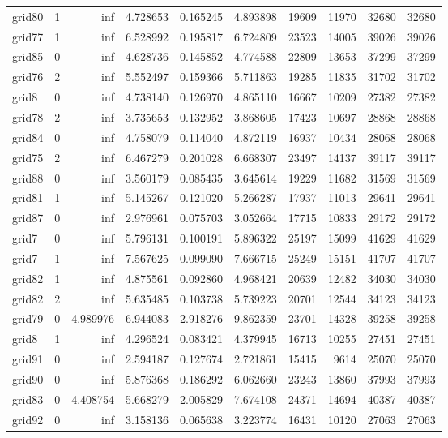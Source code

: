 \begin{longtable}{|l|r|r|r|r|r|r|r|r|r|}
grid80 & 1 & inf & 4.728653 & 0.165245 & 4.893898 & 19609 & 11970 & 32680 & 32680 \\
grid77 & 1 & inf & 6.528992 & 0.195817 & 6.724809 & 23523 & 14005 & 39026 & 39026 \\
grid85 & 0 & inf & 4.628736 & 0.145852 & 4.774588 & 22809 & 13653 & 37299 & 37299 \\
grid76 & 2 & inf & 5.552497 & 0.159366 & 5.711863 & 19285 & 11835 & 31702 & 31702 \\
grid8 & 0 & inf & 4.738140 & 0.126970 & 4.865110 & 16667 & 10209 & 27382 & 27382 \\
grid78 & 2 & inf & 3.735653 & 0.132952 & 3.868605 & 17423 & 10697 & 28868 & 28868 \\
grid84 & 0 & inf & 4.758079 & 0.114040 & 4.872119 & 16937 & 10434 & 28068 & 28068 \\
grid75 & 2 & inf & 6.467279 & 0.201028 & 6.668307 & 23497 & 14137 & 39117 & 39117 \\
grid88 & 0 & inf & 3.560179 & 0.085435 & 3.645614 & 19229 & 11682 & 31569 & 31569 \\
grid81 & 1 & inf & 5.145267 & 0.121020 & 5.266287 & 17937 & 11013 & 29641 & 29641 \\
grid87 & 0 & inf & 2.976961 & 0.075703 & 3.052664 & 17715 & 10833 & 29172 & 29172 \\
grid7 & 0 & inf & 5.796131 & 0.100191 & 5.896322 & 25197 & 15099 & 41629 & 41629 \\
grid7 & 1 & inf & 7.567625 & 0.099090 & 7.666715 & 25249 & 15151 & 41707 & 41707 \\
grid82 & 1 & inf & 4.875561 & 0.092860 & 4.968421 & 20639 & 12482 & 34030 & 34030 \\
grid82 & 2 & inf & 5.635485 & 0.103738 & 5.739223 & 20701 & 12544 & 34123 & 34123 \\
grid79 & 0 & 4.989976 & 6.944083 & 2.918276 & 9.862359 & 23701 & 14328 & 39258 & 39258 \\
grid8 & 1 & inf & 4.296524 & 0.083421 & 4.379945 & 16713 & 10255 & 27451 & 27451 \\
grid91 & 0 & inf & 2.594187 & 0.127674 & 2.721861 & 15415 & 9614 & 25070 & 25070 \\
grid90 & 0 & inf & 5.876368 & 0.186292 & 6.062660 & 23243 & 13860 & 37993 & 37993 \\
grid83 & 0 & 4.408754 & 5.668279 & 2.005829 & 7.674108 & 24371 & 14694 & 40387 & 40387 \\
grid92 & 0 & inf & 3.158136 & 0.065638 & 3.223774 & 16431 & 10120 & 27063 & 27063 \\

\end{longtable}
